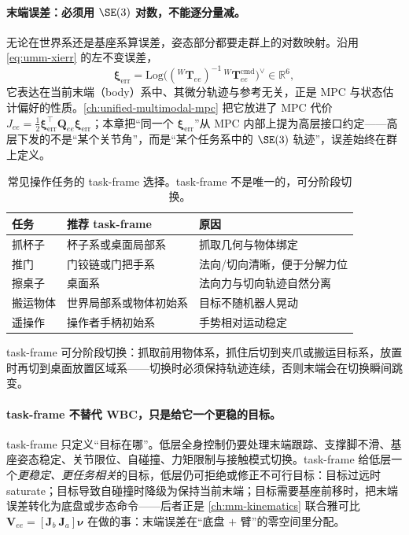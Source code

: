 \paragraph{末端误差：必须用 $\SE(3)$ 对数，不能逐分量减。}
无论在世界系还是基座系算误差，姿态部分都要走群上的对数映射。沿用 \cref{eq:umm-xierr} 的左不变误差，
\begin{equation}
  \boldsymbol\xi_{\mathrm{err}}=\mathrm{Log}\!\big(({}^{W}\mathbf{T}_{ee})^{-1}\,{}^{W}\mathbf{T}_{ee}^{\mathrm{cmd}}\big)^{\vee}\in\mathbb R^6,
  \label{eq:si-xierr}
\end{equation}
它表达在当前末端（body）系中、其微分轨迹与参考无关，正是 MPC 与状态估计偏好的性质。\cref{ch:unified-multimodal-mpc} 把它放进了 MPC 代价 $J_{ee}=\tfrac12\boldsymbol\xi_{\mathrm{err}}^\top\mathbf Q_{ee}\boldsymbol\xi_{\mathrm{err}}$；本章把“同一个 $\boldsymbol\xi_{\mathrm{err}}$”从 MPC 内部上提为高层接口约定——高层下发的不是“某个关节角”，而是“某个任务系中的 $\SE(3)$ 轨迹”，误差始终在群上定义。

\begin{table}[H]\centering\small
\caption{常见操作任务的 task-frame 选择。task-frame 不是唯一的，可分阶段切换。}
\label{tab:si-taskframe-choice}
\begin{tabular}{lll}
\toprule
任务 & 推荐 task-frame & 原因 \\
\midrule
抓杯子 & 杯子系或桌面局部系 & 抓取几何与物体绑定 \\
推门 & 门铰链或门把手系 & 法向/切向清晰，便于分解力位 \\
擦桌子 & 桌面系 & 法向力与切向轨迹自然分离 \\
搬运物体 & 世界局部系或物体初始系 & 目标不随机器人晃动 \\
遥操作 & 操作者手柄初始系 & 手势相对运动稳定 \\
\bottomrule
\end{tabular}
\end{table}

\noindent task-frame 可分阶段切换：抓取前用物体系，抓住后切到夹爪或搬运目标系，放置时再切到桌面放置区域系——切换时必须保持轨迹连续，否则末端会在切换瞬间跳变。

\paragraph{task-frame 不替代 WBC，只是给它一个更稳的目标。}
task-frame 只定义“目标在哪”。低层全身控制仍要处理末端跟踪、支撑脚不滑、基座姿态稳定、关节限位、自碰撞、力矩限制与接触模式切换。task-frame 给低层一个\emph{更稳定、更任务相关}的目标，低层仍可拒绝或修正不可行目标：目标过远时 saturate；目标导致自碰撞时降级为保持当前末端；目标需要基座前移时，把末端误差转化为底盘或步态命令——后者正是 \cref{ch:mm-kinematics} 联合雅可比 $\mathbf V_{ee}=[\mathbf J_b\ \mathbf J_a]\boldsymbol\nu$ 在做的事：末端误差在“底盘 $+$ 臂”的零空间里分配。

